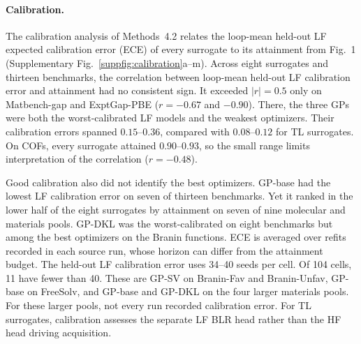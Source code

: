 \paragraph{Calibration.} The calibration analysis of Methods~4.2 relates the loop-mean held-out LF expected calibration error (ECE) of every surrogate to its attainment from Fig.~1 (Supplementary Fig.~\ref{suppfig:calibration}a--m). Across eight surrogates and thirteen benchmarks, the correlation between loop-mean held-out LF calibration error and attainment had no consistent sign. It exceeded $|r| = 0.5$ only on Matbench-gap and ExptGap-PBE ($r = -0.67$ and $-0.90$). There, the three GPs were both the worst-calibrated LF models and the weakest optimizers. Their calibration errors spanned $0.15$--$0.36$, compared with $0.08$--$0.12$ for TL surrogates. On COFs, every surrogate attained $0.90$--$0.93$, so the small range limits interpretation of the correlation ($r = -0.48$).

Good calibration also did not identify the best optimizers. GP-base had the lowest LF calibration error on seven of thirteen benchmarks. Yet it ranked in the lower half of the eight surrogates by attainment on seven of nine molecular and materials pools. GP-DKL was the worst-calibrated on eight benchmarks but among the best optimizers on the Branin functions. ECE is averaged over refits recorded in each source run, whose horizon can differ from the attainment budget. The held-out LF calibration error uses 34--40 seeds per cell. Of 104 cells, 11 have fewer than 40. These are GP-SV on Branin-Fav and Branin-Unfav, GP-base on FreeSolv, and GP-base and GP-DKL on the four larger materials pools. For these larger pools, not every run recorded calibration error. For TL surrogates, calibration assesses the separate LF BLR head rather than the HF head driving acquisition.

